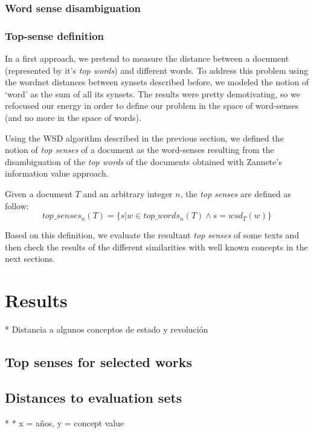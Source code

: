 \documentclass{pnastwo}
\newcommand\sq[1]{\textquoteleft #1\textquoteright}
\begin{document}
\begin{article}
\subsubsection{Word sense disambiguation}

\subsubsection{Top-sense definition}

In a first approach, we pretend to measure the distance between a document (represented by it's \textit{top words}) and different words. To address this problem using the wordnet distances between synsets described before, we modeled the notion of \sq{word} as the sum of all its synsets. The results were pretty demotivating, so we refocused our energy in order to define our problem in the space of word-senses (and no more in the space of words). 

Using the WSD algorithm described in the previous section, we defined the notion of \textit{top senses} of a document as the word-senses resulting from the disambiguation of the \textit{top words} of the documents obtained with Zannete's information value approach.

Given a document $T$ and an arbitrary integer $n$, the \textit{top senses} are defined as follow:
\begin{equation}
  top\_senses_{n}(T) = \{s | w \in top\_words_{n}(T) \wedge  s = wsd_T(w)\}
\end{equation}

Based on this definition, we evaluate the resultant \textit{top senses} of some texts and then check the results of the different similarities with well known concepts in the next sections.

\section{Results}
* Distancia a algunos conceptos de estado y revolución

\subsection{Top senses for selected works}

\subsection{Distances to evaluation sets}
*
* x = {años}, y = {concept value}


\end{article}
\end{document}

